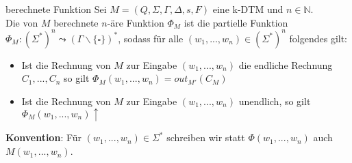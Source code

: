 \begin{defn}{berechnete Funktion}
    Sei $M = (Q, \Sigma, \Gamma, \Delta, s, F)$ eine k-DTM und $n \in \mathbb{N}$. \\

    Die von $M$ berechnete $n$-äre Funktion $\Phi_M$ ist die partielle Funktion $\Phi_M : (\Sigma^*)^n \leadsto (\Gamma\backslash\{\square\})^*$,
    sodass für alle $(w_1,...,w_n) \in (\Sigma^*)^n$ folgendes gilt: \\

    \begin{itemize}
        \item Ist die Rechnung von $M$ zur Eingabe $(w_1,...,w_n)$ die endliche Rechnung $C_1,...,C_n$ so gilt $\Phi_M(w_1,...,w_n)=out_{M'}(C_M)$
        \item Ist die Rechnung von $M$ zur Eingabe $(w_1,...,w_n)$ unendlich, so gilt $\Phi_M(w_1,...,w_n)\uparrow$
    \end{itemize}

    \textbf{Konvention}: Für $(w_1,...,w_n) \in \Sigma^*$ schreiben wir statt $\Phi(w_1,...,w_n)$ auch $M(w_1,...,w_n)$.
\end{defn}